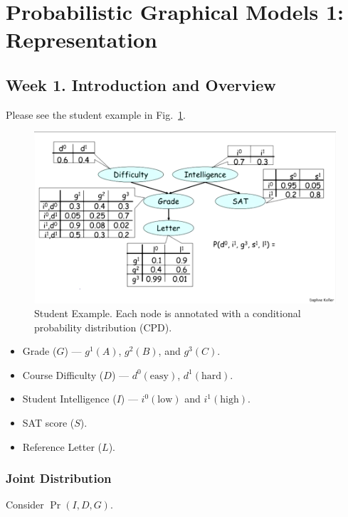 \documentclass[12pt]{article}
\begin{document}
\section{Probabilistic Graphical Models 1: Representation}

\subsection{Week 1. Introduction and Overview}

Please see the student example in Fig.~\ref{fig:student_example}.

\begin{figure}[H]
\centering
\includegraphics[width=6in]{graphics/example_student.png}
\caption{Student Example. Each node is annotated with a conditional probability distribution (CPD).}
\label{fig:student_example}
\end{figure}


\begin{itemize}
    \item Grade ($G$) --- $g^1(A)$, $g^2(B)$, and $g^3(C)$.
    \item Course Difficulty ($D$) --- $d^0(\text{easy})$, $d^1(\text{hard})$.
    \item Student Intelligence ($I$) --- $i^0(\text{low})$ and $i^1(\text{high})$.
    \item SAT score ($S$).
    \item Reference Letter ($L$).
\end{itemize}
 



\subsubsection{Joint Distribution}
Consider $\Pr(I, D, G)$.
\end{document}
